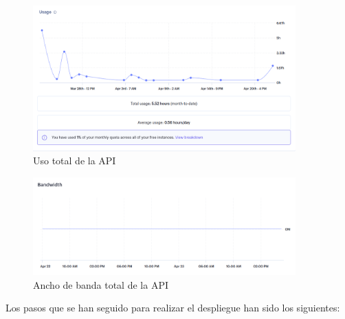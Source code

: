 \begin{figure}[H]
    \centering
    \includegraphics[width=0.9\textwidth]{imgs/usage.png}
    \caption{Uso total de la API}
    \label{fig:usage-render}
\end{figure}

\begin{figure}[H]
    \centering
    \includegraphics[width=0.9\textwidth]{imgs/bandwidth.png}
    \caption{Ancho de banda total de la API}
    \label{fig:bandwidth-render}
\end{figure}

Los pasos que se han seguido para realizar el despliegue han sido los siguientes:


